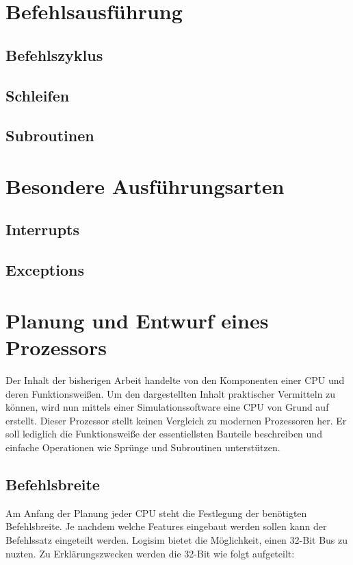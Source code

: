 \documentclass[12pt]{article}
\begin{document}
\section{Befehlsausführung}
\subsection{Befehlszyklus}
\subsection{Schleifen}
\subsection{Subroutinen}

\section{Besondere Ausführungsarten}
\subsection{Interrupts}
\subsection{Exceptions}


\newpage

\section{Planung und Entwurf eines Prozessors}
Der Inhalt der bisherigen Arbeit handelte von den Komponenten einer CPU und deren Funktionsweißen. Um den dargestellten Inhalt praktischer Vermitteln zu können, wird nun mittels einer Simulationssoftware eine CPU von Grund auf erstellt. Dieser Prozessor stellt keinen Vergleich zu modernen Prozessoren her. Er soll lediglich die Funktionsweiße der essentiellsten Bauteile beschreiben und einfache Operationen wie Sprünge und Subroutinen unterstützen.
\subsection{Befehlsbreite}
Am Anfang der Planung jeder CPU steht die Festlegung der benötigten Befehlsbreite. Je nachdem welche Features eingebaut werden sollen kann der Befehlssatz eingeteilt werden. Logisim bietet die Möglichkeit, einen 32-Bit Bus zu nuzten. Zu Erklärungszwecken werden die 32-Bit wie folgt aufgeteilt:
\end{document}
